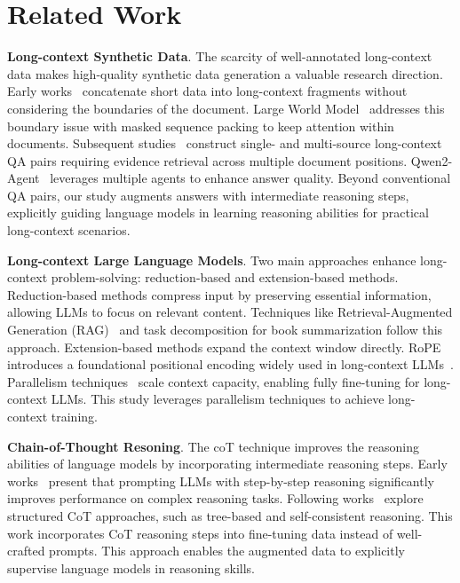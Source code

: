 \section{Related Work}

\noindent \textbf{Long-context Synthetic Data}.
The scarcity of well-annotated long-context data makes high-quality synthetic data generation a valuable research direction. 
Early works~\cite{raffel2020exploring,fu2024data} concatenate short data into long-context fragments without considering the boundaries of the document. Large World Model~\cite{liu2024world} addresses this boundary issue with masked sequence packing to keep attention within documents. 
Subsequent studies~\cite{zhang2024extending,he2024never} construct single- and multi-source long-context QA pairs requiring evidence retrieval across multiple document positions.
Qwen2-Agent~\cite{yang2024qwen2} leverages multiple agents to enhance answer quality. Beyond conventional QA pairs, our study augments answers with intermediate reasoning steps, explicitly guiding language models in learning reasoning abilities for practical long-context scenarios.

\noindent \textbf{Long-context Large Language Models}. 
Two main approaches enhance long-context problem-solving: reduction-based and extension-based methods. Reduction-based methods compress input by preserving essential information, allowing LLMs to focus on relevant content. Techniques like Retrieval-Augmented Generation (RAG)~\cite{lewis2020retrieval} and task decomposition for book summarization\cite{wu2021recursively} follow this approach.
Extension-based methods expand the context window directly. RoPE~\cite{su2024roformer} introduces a foundational positional encoding widely used in long-context LLMs~\cite{peng2024yarn, yang2024qwen2, dubey2024llama}. Parallelism techniques~\cite{ren2021zero, liu2024ringattention} scale context capacity, enabling fully fine-tuning for long-context LLMs. This study leverages parallelism techniques to achieve long-context training.

\noindent \textbf{Chain-of-Thought Resoning}. 
The coT technique improves the reasoning abilities of language models by incorporating intermediate reasoning steps.
Early works~\cite{wei2022chain} present that prompting LLMs with step-by-step reasoning significantly improves performance on complex reasoning tasks. Following works~\cite{zelikman2022star,yao2024tree} explore structured CoT approaches, such as tree-based and self-consistent reasoning. This work incorporates CoT reasoning steps into fine-tuning data instead of well-crafted prompts. This approach enables the augmented data to explicitly supervise language models in reasoning skills.